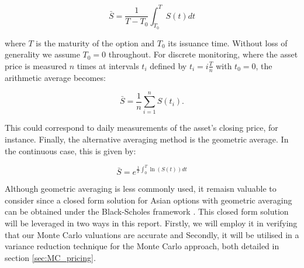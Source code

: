 \begin{equation}\label{eq:continuous_arithmethic_average}
    \bar{S} = \frac{1}{T-T_0} \int_{T_0}^{T}S(t)dt
\end{equation}

where $T$ is the maturity of the option and $T_0$ its issuance time. Without loss of generality we assume $T_0 = 0$ throughout.
For discrete monitoring, where the asset price is measured $n$ times at intervals $t_i$ defined by $t_i = i \frac{T}{n}$ with $t_0 = 0$, 
the arithmetic average becomes:

\begin{equation}\label{eq:discrete_arithmethic_average}
    \bar{S} = \frac{1}{n} \sum_{i=1}^{n}S(t_i).
\end{equation}

This could correspond to daily measurements of the asset's closing price, for instance.
Finally, the alternative averaging method is the geometric average. In the continuous case, this is given by:

\begin{equation}
    \bar{S} = e^{\frac{1}{T}\int_{0}^{T}\ln(S(t))dt}
\end{equation}
 

Although geometric averaging is less commonly used, it remaisn valuable to consider since a closed form solution for 
Asian options with geometric averaging can be obtained under the Black-Scholes framework \cite{kemna1990pricing}.
This closed form solution will be leveraged in two ways in this report. Firstly, we will employ it in verifying that 
our Monte Carlo valuations are accurate and Secondly, it will be utilised in a variance reduction technique for the Monte Carlo
approach, both detailed in section \ref{sec:MC_pricing}. 
